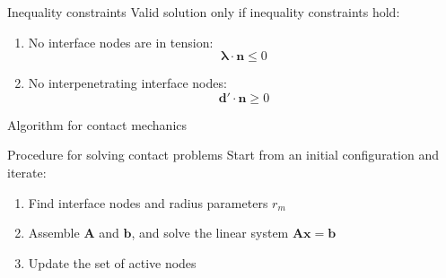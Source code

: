 \documentclass[aspectratio=169, xcolor={svgnames}]{beamer}
\begin{document}
\begin{frame}{Inequality constraints}
Valid solution only if inequality constraints hold:

\begin{enumerate}
    \item No interface nodes are in tension:
        \begin{equation} \label{equ:convcheck1}
            \boldsymbol{\lambda} \cdot \mathbf{n} \leq 0
        \end{equation}
    \item No interpenetrating interface nodes:
        \begin{equation} \label{equ:convcheck2}
            \mathbf{d}' \cdot \mathbf{n} \geq 0
        \end{equation}
\end{enumerate}
\end{frame}

\begin{frame}{Algorithm for contact mechanics}
    \begin{block}{Procedure for solving contact problems}
    Start from an initial configuration and iterate:
    \begin{enumerate}
        \item<2-> Find interface nodes and radius parameters $r_m$
        \item<3-> Assemble $\mathbf{A}$ and $\mathbf{b}$, and solve the linear system $\mathbf{A} \mathbf{x} = \mathbf{b}$
    \end{enumerate}
    \begin{enumerate}
        \setcounter{enumi}{2}
        \item<5-> Update the set of active nodes
    \end{enumerate}
    \end{block}
    
\end{frame}
\end{document}
